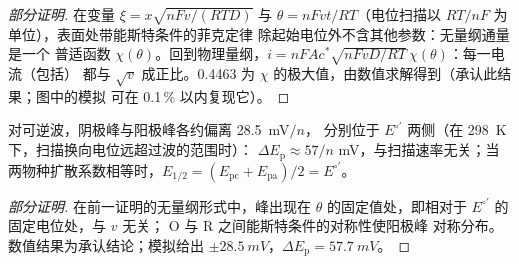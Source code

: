 \begin{proof}[部分证明]
在变量 $\xi = x\sqrt{nFv/(RTD)}$ 与 $\theta = nFvt/RT$（电位扫描以
$RT/nF$ 为单位），表面处带能斯特条件的菲克定律
除起始电位外不含其他参数：无量纲通量是一个
普适函数 $\chi(\theta)$。回到物理量纲，$i = nFAc^*\sqrt{nFvD/RT}\,\chi(\theta)$：每一电流（包括）
都与 $\sqrt v$ 成正比。0.4463 为
$\chi$ 的极大值，由数值求解得到（承认此结果；图中的模拟
可在 0.1\,\% 以内复现它）。
\end{proof}

\begin{proposition}[峰间距]\label{prop:b3:electrode-kinetics:delta-ep}
对可逆波，阴极峰与阳极峰各约偏离 \qty{28.5}{mV}$/n$，
分别位于 $E^{\circ\prime}$ 两侧（在 \qty{298}{K} 下，扫描换向电位远超过波的范围时）：
$\Delta E_{\mathrm p} \approx 57/n$ mV，与扫描速率无关；当两物种扩散系数相等时，$E_{1/2} = (E_{\mathrm{pc}} + E_{\mathrm{pa}})/2 =
E^{\circ\prime}$。
\end{proposition}

\begin{proof}[部分证明]
在前一证明的无量纲形式中，峰出现在
$\theta$ 的固定值处，即相对于 $E^{\circ\prime}$ 的固定电位处，与 $v$ 无关；
O 与 R 之间能斯特条件的对称性使阳极峰
对称分布。数值结果为承认结论；模拟给出
$\pm\qty{28.5}{mV}$，$\Delta E_{\mathrm p} = \qty{57.7}{mV}$。
\end{proof}

